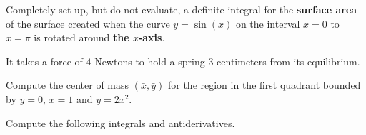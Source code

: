 \documentclass[addpoints,12pt]{exam}
\newcommand {\ds}{\displaystyle}
\begin{document}
\begin{questions}
\newpage

\question[6] Completely set up, but do not evaluate, a definite
  integral for the \textbf{surface area} of the surface created when the
  curve $\ds y=\sin(x)$ on the interval $x=0$ to $x=\pi$ is rotated
  around \textbf{the $x$-axis}.\\

\vfill

\question[10] It takes a force of $4$ Newtons to hold a spring $3$
  centimeters from its equilibrium.

\vfill

\newpage

\question[10] Compute the center of mass $(\bar{x},\bar{y})$ for the
  region in the first quadrant bounded by $y=0$, $x=1$ and $y=2x^2$.\\
 

  \newpage

\question Compute the following integrals and antiderivatives.
\end{questions}
\end{document}
